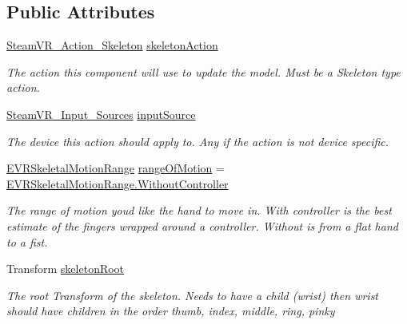\subsection*{Public Attributes}
\begin{DoxyCompactItemize}
\item 
\mbox{\hyperlink{class_valve_1_1_v_r_1_1_steam_v_r___action___skeleton}{Steam\+V\+R\+\_\+\+Action\+\_\+\+Skeleton}} \mbox{\hyperlink{class_valve_1_1_v_r_1_1_steam_v_r___behaviour___skeleton_af270033fb4eda247a5b5c10e2ab48a12}{skeleton\+Action}}
\begin{DoxyCompactList}\small\item\em The action this component will use to update the model. Must be a Skeleton type action. \end{DoxyCompactList}\item 
\mbox{\hyperlink{namespace_valve_1_1_v_r_a82e5bf501cc3aa155444ee3f0662853f}{Steam\+V\+R\+\_\+\+Input\+\_\+\+Sources}} \mbox{\hyperlink{class_valve_1_1_v_r_1_1_steam_v_r___behaviour___skeleton_a794d8178d3505640a8ec6183d8807221}{input\+Source}}
\begin{DoxyCompactList}\small\item\em The device this action should apply to. Any if the action is not device specific. \end{DoxyCompactList}\item 
\mbox{\hyperlink{namespace_valve_1_1_v_r_affc8d18345f8f5d36f1ae7b4ce534500}{E\+V\+R\+Skeletal\+Motion\+Range}} \mbox{\hyperlink{class_valve_1_1_v_r_1_1_steam_v_r___behaviour___skeleton_aa59eca01a50adefc4986d5b3abb18e9c}{range\+Of\+Motion}} = \mbox{\hyperlink{namespace_valve_1_1_v_r_aabb506007a41244de5c315ff5519439fa410e70ab7664c51ec348aecbe772ae58}{E\+V\+R\+Skeletal\+Motion\+Range.\+Without\+Controller}}
\begin{DoxyCompactList}\small\item\em The range of motion you\textquotesingle{}d like the hand to move in. With controller is the best estimate of the fingers wrapped around a controller. Without is from a flat hand to a fist. \end{DoxyCompactList}\item 
Transform \mbox{\hyperlink{class_valve_1_1_v_r_1_1_steam_v_r___behaviour___skeleton_a6f534ee0c22238eda2d92ac44dbf2a9f}{skeleton\+Root}}
\begin{DoxyCompactList}\small\item\em The root Transform of the skeleton. Needs to have a child (wrist) then wrist should have children in the order thumb, index, middle, ring, pinky \end{DoxyCompactList}\item 

\end{DoxyCompactItemize}

